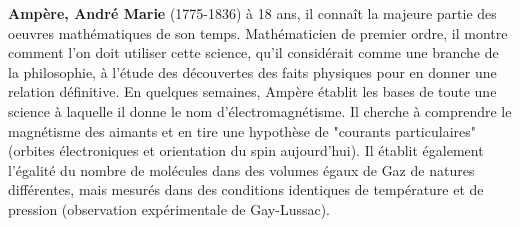 \pichskip{15pt}%
\textbf{Ampère, André Marie} (1775-1836) à 18 ans, il connaît la majeure partie des oeuvres mathématiques de son temps. Mathématicien de premier ordre, il montre comment l'on doit utiliser cette science, qu'il considérait comme une branche de la philosophie, à l'étude des découvertes des faits physiques pour en donner une relation définitive. En quelques semaines, Ampère établit les bases de toute une science à laquelle il donne le nom d'électromagnétisme. Il cherche à comprendre le magnétisme des aimants et en tire une hypothèse de "courants particulaires" (orbites électroniques et orientation du spin aujourd'hui). Il établit également l'égalité du nombre de molécules dans des volumes égaux de Gaz de natures différentes, mais mesurés dans des conditions identiques de température et de pression (observation expérimentale de Gay-Lussac).

